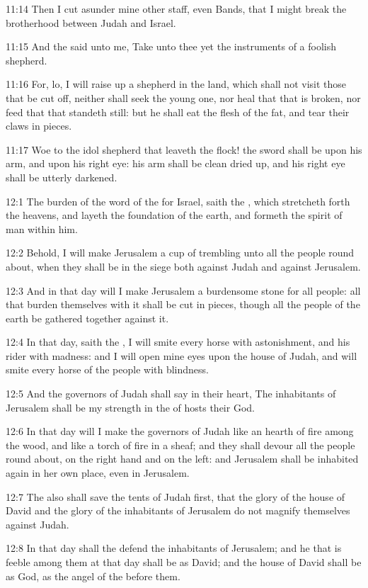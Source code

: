 11:14 Then I cut asunder mine other staff, even Bands, that I might break the brotherhood between Judah and Israel.

11:15 And the \LORD said unto me, Take unto thee yet the instruments of a foolish shepherd.

11:16 For, lo, I will raise up a shepherd in the land, which shall not visit those that be cut off, neither shall seek the young one, nor heal that that is broken, nor feed that that standeth still: but he shall eat the flesh of the fat, and tear their claws in pieces.

11:17 Woe to the idol shepherd that leaveth the flock! the sword shall be upon his arm, and upon his right eye: his arm shall be clean dried up, and his right eye shall be utterly darkened.

12:1 The burden of the word of the \LORD for Israel, saith the \LORD, which stretcheth forth the heavens, and layeth the foundation of the earth, and formeth the spirit of man within him.

12:2 Behold, I will make Jerusalem a cup of trembling unto all the people round about, when they shall be in the siege both against Judah and against Jerusalem.

12:3 And in that day will I make Jerusalem a burdensome stone for all people: all that burden themselves with it shall be cut in pieces, though all the people of the earth be gathered together against it.

12:4 In that day, saith the \LORD, I will smite every horse with astonishment, and his rider with madness: and I will open mine eyes upon the house of Judah, and will smite every horse of the people with blindness.

12:5 And the governors of Judah shall say in their heart, The inhabitants of Jerusalem shall be my strength in the \LORD of hosts their God.

12:6 In that day will I make the governors of Judah like an hearth of fire among the wood, and like a torch of fire in a sheaf; and they shall devour all the people round about, on the right hand and on the left: and Jerusalem shall be inhabited again in her own place, even in Jerusalem.

12:7 The \LORD also shall save the tents of Judah first, that the glory of the house of David and the glory of the inhabitants of Jerusalem do not magnify themselves against Judah.

12:8 In that day shall the \LORD defend the inhabitants of Jerusalem; and he that is feeble among them at that day shall be as David; and the house of David shall be as God, as the angel of the \LORD before them.

